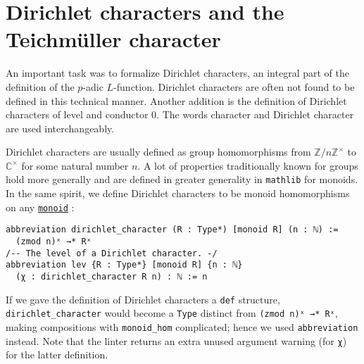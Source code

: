 \documentclass[a4paper,UKenglish,cleveref, autoref, thm-restate]{lipics-v2021}
\newcommand{\lean}[1]{\texttt{#1}\xspace} %
\begin{document}
\section{Dirichlet characters and the Teichmüller character}
\label{dirchar}
An important task was to formalize Dirichlet characters, an integral part of the definition of the $p$-adic $L$-function. 
Dirichlet characters are often not found to be defined in this technical manner. Another addition is the definition of 
Dirichlet characters of level and conductor 0. The words character and Dirichlet character are used interchangeably. 

Dirichlet characters are usually defined as group homomorphisms from $\mathbb{Z}/n \mathbb{Z}^{\times}$ to $\mathbb{C}^{\times}$ for some natural number $n$. 
A lot of properties traditionally known for groups hold more generally and are defined in greater generality in \lean{mathlib} for monoids. In the same spirit, 
we define Dirichlet characters to be monoid homomorphisms on any \href{https://leanprover-community.github.io/mathlib_docs/algebra/group/defs.html#monoid}{\lean{monoid}} :
\begin{lstlisting}
abbreviation dirichlet_character (R : Type*) [monoid R] (n : ℕ) := 
  (zmod n)ˣ →* Rˣ 
/-- The level of a Dirichlet character. -/
abbreviation lev {R : Type*} [monoid R] {n : ℕ} 
  (χ : dirichlet_character R n) : ℕ := n
\end{lstlisting}
If we gave the definition of Dirichlet characters a \lean{def} structure, 
\lean{dirichlet\_character} would become a \lean{Type} distinct from \lean{(zmod n)ˣ →* Rˣ}, 
making compositions with \lean{monoid\_hom} complicated; hence we used \lean{abbreviation} instead. 
Note that the linter returns an extra unused argument warning (for \lean{χ}) for the latter definition. 
\end{document}
